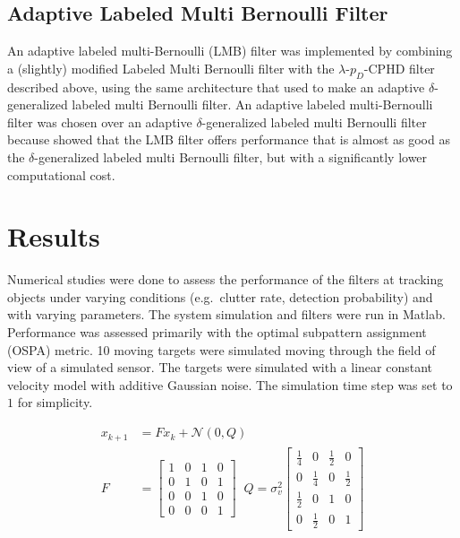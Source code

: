 \documentclass{article}
\begin{document}
\subsection*{Adaptive Labeled Multi Bernoulli Filter}
An adaptive labeled multi-Bernoulli (LMB) filter was implemented by combining a (slightly) modified Labeled Multi Bernoulli\cite{lmb} filter with the $\lambda$-$p_D$-CPHD filter described above, using the same architecture that \cite{adaptive_dglmb} used to make an adaptive $\delta$-generalized labeled multi Bernoulli filter. An adaptive labeled multi-Bernoulli filter was chosen over an adaptive $\delta$-generalized labeled multi Bernoulli filter because \cite{lmb} showed that the LMB filter offers performance that is almost as good as the $\delta$-generalized labeled multi Bernoulli filter, but with a significantly lower computational cost.

\section*{Results}
Numerical studies were done to assess the performance of the filters at tracking objects under varying conditions (e.g.\ clutter rate, detection probability) and with varying parameters. The system simulation and filters were run in Matlab. Performance was assessed primarily with the optimal subpattern assignment (OSPA)\cite{OSPA} metric. 10 moving targets were simulated moving through the field of view of a simulated sensor. The targets were simulated with a linear constant velocity model with additive Gaussian noise. The simulation time step was set to $1$ for simplicity.

\begin{align}
  x_{k+1} &= Fx_k + \mathcal{N}(0, Q)\\
  F &=
  \begin{bmatrix}
    1 & 0 & 1 & 0\\
    0 & 1 & 0 & 1\\
    0 & 0 & 1 & 0\\
    0 & 0 & 0 & 1
  \end{bmatrix}\;\;
                Q
                = \sigma^2_v
  \begin{bmatrix}
    \frac{1}{4} & 0 & \frac{1}{2} & 0\\
    0 & \frac{1}{4} & 0 & \frac{1}{2}\\
     \frac{1}{2} & 0 & 1 & 0\\
    0 &  \frac{1}{2} & 0 & 1
  \end{bmatrix}\\           
\end{align}
\end{document}
